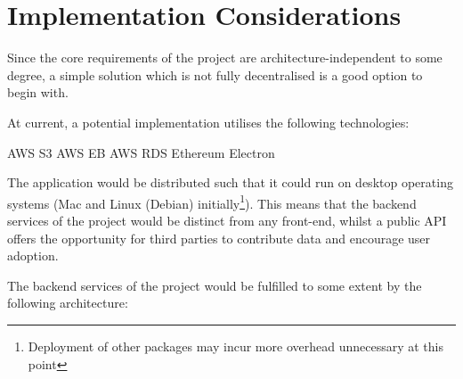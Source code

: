 \section{Implementation Considerations}

Since the core requirements of the project are architecture-independent to some degree, a simple solution which is not fully decentralised is a good option to begin with.

At current, a potential implementation utilises the following technologies:

\begin{outline}
  \1 AWS S3
  \1 AWS EB
  \1 AWS RDS
  \1 Ethereum
  \1 Electron
\end{outline}

The application would be distributed such that it could run on desktop operating systems (Mac and Linux (Debian) initially\footnote{Deployment of other packages may incur more overhead unnecessary at this point}). This means that the backend services of the project would be distinct from any front-end, whilst a public API offers the opportunity for third parties to contribute data and encourage user adoption.

The backend services of the project would be fulfilled to some extent by the following architecture:



